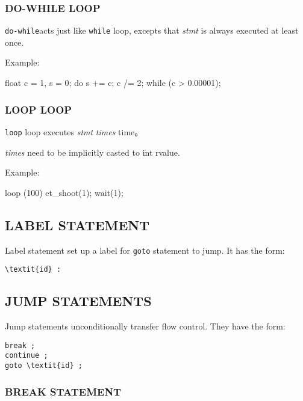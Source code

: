 \documentclass{article}
\begin{document}
\subsubsection{DO-WHILE LOOP}

\verb|do-while|acts just like \verb|while| loop, excepts that \textit{stmt} is always executed at least once.

Example:

\begin{MUAvbt}
float c = 1, s = 0;
do {
	s += c;
	c /= 2;
} while (c > 0.00001);
\end{MUAvbt}

\subsubsection{LOOP LOOP}

\verb|loop| loop executes \textit{stmt} \textit{times} time。

\textit{times} need to be implicitly casted to int rvalue.

Example:

\begin{MUAvbt}
loop (100) {
	et_shoot(1);
	wait(1);
}
\end{MUAvbt}

\subsection{LABEL STATEMENT}

Label statement set up a label for \verb|goto| statement to jump. It has the form:

\begin{Verbatim}[frame=single, rulecolor=\color{magenta}, commandchars=\\\{\}]
\textit{id} :
\end{Verbatim}

\subsection{JUMP STATEMENTS}

Jump statements unconditionally transfer flow control. They have the form:

\begin{Verbatim}[frame=single, rulecolor=\color{magenta}, commandchars=\\\{\}]
break ;
continue ;
goto \textit{id} ;
\end{Verbatim}

\subsubsection{BREAK STATEMENT}
\end{document}
